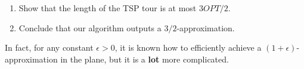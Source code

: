 \documentclass[12pt]{article}
\begin{document}
\begin{enumerate}
\item Show that the length of the TSP tour is at most $3OPT/2$.




\item Conclude that our algorithm outputs a $3/2$-approximation.

\end{enumerate}


In fact, for any constant $\epsilon > 0$, it is known how to efficiently achieve a $(1+\epsilon)$-approximation in the plane, but it is a {\bf lot} more complicated. 


\end{document}
